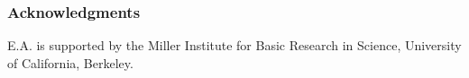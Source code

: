 \documentclass[aoas,preprint]{imsart}
\begin{document}
\tableofcontents















\subsubsection*{Acknowledgments}

E.A. is supported by the Miller Institute for Basic Research in Science,
University of California, Berkeley.



\end{document}
